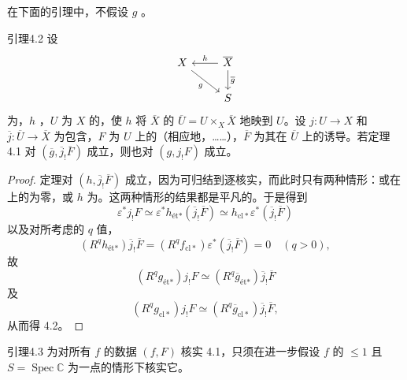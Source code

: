 在下面的引理中，不假设 $g$ 。
\begin{SGAresult}{引理}{4.2}
设
\[
\begin{tikzcd}
X\arrow[dr,"g"']&\overline X\arrow[l,"h"']\arrow[d,"\overline g"]\\&S
\end{tikzcd}
\]
为，$h$ ，$U$ 为 $X$ 的，使 $h$ 将 $\overline X$ 的 $\overline U=U\times_X\overline X$ 地映到 $U$。设 $j:U\to X$ 和 $\overline j:\overline U\to\overline X$ 为包含，$F$ 为 $U$ 上的（相应地，……），$\overline F$ 为其在 $\overline U$ 上的诱导。若定理 4.1 对 $(\overline g,\overline j_!\overline F)$ 成立，则也对 $(g,j_!F)$ 成立。
\end{SGAresult}
\begin{proof}
定理对 $(h,\overline j_!\overline F)$ 成立，因为可归结到逐核实，而此时只有两种情形：或在上的为零，或 $h$ 为。这两种情形的结果都是平凡的。于是得到
\[
\varepsilon^*j_!F\simeq\varepsilon^*h_{\text{ét}*}(\overline j_!\overline F)\simeq h_{\mathrm{cl}*}\varepsilon^*(\overline j_!\overline F)
\]
以及对所考虑的 $q$ 值，
\[
(R^qh_{\text{ét}*})\overline j_!\overline F=(R^qf_{\mathrm{cl}*})\varepsilon^*(\overline j_!\overline F)=0\quad(q>0),
\]
故
\[
(R^qg_{\text{ét}*})j_!F\simeq(R^q\overline g_{\text{ét}*})\overline j_!\overline F
\]
及
\[
(R^qg_{\mathrm{cl}*})j_!F\simeq(R^q\overline g_{\mathrm{cl}*})\overline j_!\overline F,
\]
从而得 4.2。
\end{proof}
\begin{SGAresult}{引理}{4.3}
为对所有 $f$ 的数据 $(f,F)$ 核实 4.1，只须在进一步假设 $f$ 的 $\leq1$ 且 $S=\operatorname{Spec}\mathbb C$ 为一点的情形下核实它。
\end{SGAresult}
